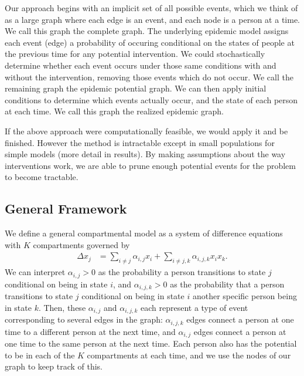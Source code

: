 \documentclass[PTRSB]{rsos}
\begin{document}
\begin{multicols}{2}
Our approach begins with an implicit set of all possible events, which we think of as a large graph where each edge is an event, and each node is a person at a time. %
We call this graph the complete graph.
The underlying epidemic model assigns each event (edge) a probability of occuring conditional on the states of people at the previous time for any potential intervention.
We could stochastically determine whether each event occurs under those same conditions with and without the intervention, removing those events which do not occur.
We call the remaining graph the epidemic potential graph.
We can then apply initial conditions to determine which events actually occur, and the state of each person at each time.
We call this graph the realized epidemic graph.

If the above approach were computationally feasible, we would apply it and be finished.
However the method is intractable except in small populations for simple models (more detail in results).
By making assumptions about the way interventions work, we are able to prune enough potential events for the problem to become tractable.

\subsection*{General Framework}
We define a general compartmental model as a system of difference equations with $K$ compartments governed by 
\begin{align*}
\Delta x_{j} &= \sum_{i \neq j} \alpha_{i,j}x_i + \sum_{i \neq j, k} \alpha_{i,j,k} x_ix_k.
\end{align*}
We can interpret $\alpha_{i,j} > 0$ as the probability a person transitions to state $j$ conditional on being in state $i$, and $\alpha_{i,j,k} > 0$ as the probability that a person transitions to state $j$ conditional on being in state $i$ another specific person being in state $k$.
Then, these $\alpha_{i,j}$ and $\alpha_{i,j,k}$ each represent a type of event corresponding to several edges in the graph: $\alpha_{i,j,k}$ edges connect a person at one time to a different person at the next time, and $\alpha_{i,j}$ edges connect a person at one time to the same person at the next time.
Each person also has the potential to be in each of the $K$ compartments at each time, and we use the nodes of our graph to keep track of this.


\end{multicols}
\end{document}
